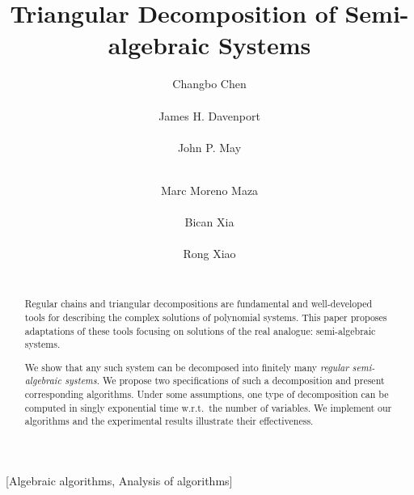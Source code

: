 \documentclass{sig-alternate}
\begin{document}
\title{Triangular Decomposition of Semi-algebraic Systems}
\author{
\alignauthor
Changbo Chen\\
       \\
\alignauthor
James H. Davenport\\
       \\
\alignauthor 
John P. May\\
       \\
\and
\alignauthor 
Marc Moreno Maza\\
       \\
\alignauthor
Bican Xia\\
       \\
\alignauthor
Rong Xiao\\
       \\
}




\maketitle
\begin{abstract}
Regular chains and triangular decompositions are
fundamental and well-developed tools for describing the complex solutions 
of polynomial systems. 
This paper proposes adaptations of these tools focusing
on solutions of the real analogue:
semi-algebraic systems.

We show that any such system can be decomposed into finitely many 
{\em regular semi-algebraic systems}.
We propose two specifications of such a decomposition
and present corresponding algorithms.
Under some assumptions, one type of decomposition can be computed in singly 
exponential time w.r.t.\ the number of variables.  
We implement our algorithms and 
the experimental results illustrate their effectiveness.
\end{abstract}

[Algebraic algorithms, Analysis of algorithms]
\end{document}

